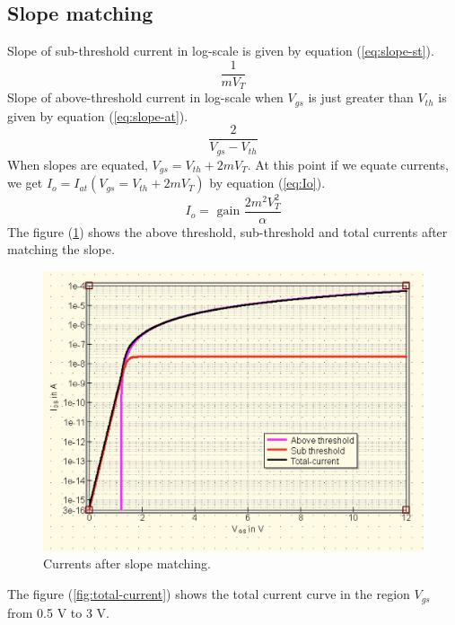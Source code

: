 \documentclass{article}
\begin{document}
\subsection{Slope matching}
Slope of sub-threshold current in log-scale is given by equation (\ref{eq:slope-st}). 
\begin{equation}
    \label{eq:slope-st}
    \frac{1}{mV_T}
\end{equation}
Slope of above-threshold current in log-scale when $V_{gs}$ is just greater than $V_{th}$ is given by equation (\ref{eq:slope-at}). 
\begin{equation}
    \label{eq:slope-at}
    \frac{2}{V_{gs}-V_{th}}
\end{equation}
When slopes are equated, $V_{gs} = V_{th} + 2mV_T$. At this point if we equate currents, we get $I_o = I_{at}(V_{gs}=V_{th}+ 2 m V_T) $ by equation (\ref{eq:Io}). 
\begin{equation}
    \label{eq:Io}
    I_o = \text{ gain } \frac{2 m^2 V_T ^ 2 }{\alpha} 
\end{equation}
The figure (\ref{fig:at-st-tt}) shows the above threshold, sub-threshold and total currents after matching the slope. 
\begin{figure}[h]
    
    \includegraphics[scale = 0.4]{../Images/03082024/slope-Io.png}
    \caption{Currents after slope matching.}
    \label{fig:at-st-tt}
\end{figure}
The figure (\ref{fig:total-current}) shows the total current curve in the region $V_{gs}$ from 0.5 V to 3 V. 
\end{document}
